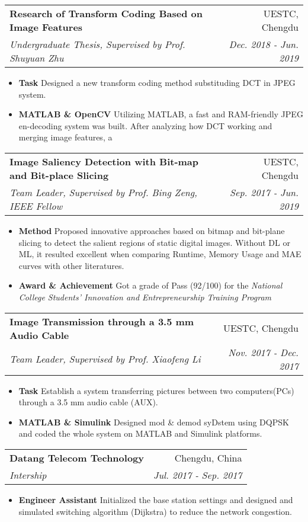 \documentclass[9pt, a4paper]{article}
\makeatletter
\newcommand{\resumeItem}[2]{
  \item\small{
    \textbf{#1}{ #2 \vspace{-2pt}}
  }
}
\newcommand{\resumeSubheading}[4]{
  \vspace{-1pt}\item
    \begin{tabular*}{0.97\textwidth}{l@{\extracolsep{\fill}}r}
      \textbf{#1} & #2 \\
      \textit{\small#3} & \textit{\small #4} \\
    \end{tabular*}\vspace{-5pt}
}
\newcommand{\resumeItemListStart}{\begin{itemize}}
\newcommand{\resumeItemListEnd}{\end{itemize}\vspace{-5pt}}
\makeatother
\begin{document}

    \resumeSubheading
      {Research of Transform Coding Based on Image Features}{UESTC, Chengdu}
      {Undergraduate Thesis, Supervised by Prof. Shuyuan Zhu}{Dec. 2018 - Jun. 2019}
      \resumeItemListStart
        \resumeItem{Task}
          {Designed a new transform coding method substituding DCT in JPEG system.}
        \resumeItem{MATLAB \& OpenCV}
          {Utilizing MATLAB, a fast and RAM-friendly JPEG en-decoding system was built. After analyzing how DCT working and merging image features, a }
      \resumeItemListEnd

    \resumeSubheading
    {Image Saliency Detection with Bit-map and Bit-place Slicing}{UESTC, Chengdu}
    {Team Leader, Supervised by Prof. Bing Zeng, IEEE Fellow}{Sep. 2017 - Jun. 2019}
    \resumeItemListStart
      \resumeItem{Method}
        {Proposed innovative approaches based on bitmap and bit-plane slicing to detect the salient regions of static digital images. Without DL or ML, it resulted excellent when comparing Runtime, Memory Usage and MAE curves with other literatures.}
        \resumeItem{Award \& Achievement}
        {Got a grade of Pass (92/100) for the \textsl{National College Students' Innovation and Entrepreneurship Training Program}}
    \resumeItemListEnd

    \resumeSubheading
    {Image Transmission through a 3.5 mm Audio Cable}{UESTC, Chengdu}
    {Team Leader, Supervised by Prof. Xiaofeng Li}{Nov. 2017 - Dec. 2017}
    \resumeItemListStart
      \resumeItem{Task}
        {Establish a system transferring pictures between two computers(PCs) through a 3.5 mm audio cable (AUX).}
      \resumeItem{MATLAB \& Simulink}
        {Designed mod \& demod syDstem using DQPSK and coded the whole system on MATLAB and Simulink platforms.}
    \resumeItemListEnd

    \resumeSubheading
    {Datang Telecom Technology}{Chengdu, China}
    {Intership}{Jul. 2017 - Sep. 2017}
    \resumeItemListStart
      \resumeItem{Engineer Assistant}
        {Initialized the base station settings and designed and simulated switching algorithm (Dijkstra) to reduce the network congestion.}
    \resumeItemListEnd
\end{document}
